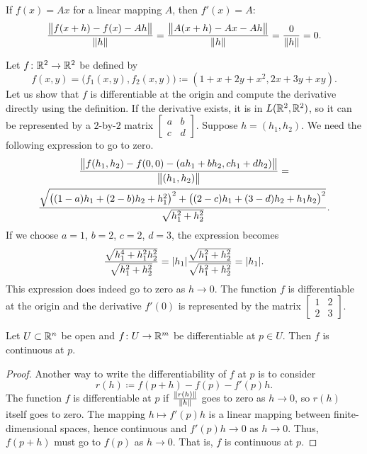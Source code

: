 \begin{example}
If $f(x) = Ax$ for a linear mapping $A$, then
$f'(x) = A$:
\begin{equation*}
\frac{\bigl\lVert {f(x+h)-f(x) - Ah} \bigr\rVert}{\lVert {h} \rVert}
=
\frac{\bigl\lVert {A(x+h)-Ax - Ah} \bigr\rVert}{\lVert {h} \rVert}
=
\frac{0}{\lVert {h} \rVert} = 0 .
\end{equation*}
\end{example}

\begin{example}
Let $f \colon {\mathbb{R}}^2 \to {\mathbb{R}}^2$ be defined by
\begin{equation*}
f(x,y) = \bigl(f_1(x,y),f_2(x,y)\bigr) \coloneqq (1+x+2y+x^2,2x+3y+xy).
\end{equation*}
Let us show that $f$ is differentiable at the origin and
compute the derivative directly using the definition.
If the derivative exists, it is in $L({\mathbb{R}}^2,{\mathbb{R}}^2)$, so it can be
represented by a $2$-by-$2$ matrix
$\left[\begin{smallmatrix}a&b\\c&d\end{smallmatrix}\right]$.  Suppose $h =
(h_1,h_2)$.  We need the following expression to go to zero.
\begin{multline*}
\frac{\bigl\lVert {
f(h_1,h_2)-f(0,0)
-
(ah_1 +bh_2 , ch_1+dh_2)} \bigr\rVert
}{\bigl\lVert {(h_1,h_2)} \bigr\rVert}
=
\\
\frac{\sqrt{
{\bigl((1-a)h_1 + (2-b)h_2 + h_1^2\bigr)}^2
+
{\bigl((2-c)h_1 + (3-d)h_2 + h_1h_2\bigr)}^2}}{\sqrt{h_1^2+h_2^2}} .
\end{multline*}
If we choose $a=1$, $b=2$, $c=2$, $d=3$, the expression becomes
\begin{equation*}
\frac{\sqrt{
h_1^4 + h_1^2h_2^2}}{\sqrt{h_1^2+h_2^2}}
=
\lvert {h_1} \rvert
\frac{\sqrt{
h_1^2 + h_2^2}}{\sqrt{h_1^2+h_2^2}}
= \lvert {h_1} \rvert .
\end{equation*}
This expression does indeed go to zero as $h \to 0$.  The
function $f$ is differentiable at the origin and 
the derivative $f'(0)$ is represented by the matrix
$\left[\begin{smallmatrix}1&2\\2&3\end{smallmatrix}\right]$.
\end{example}

\begin{prop}
Let $U \subset {\mathbb{R}}^n$ be open and $f \colon U \to {\mathbb{R}}^m$ be
differentiable at $p \in U$.  Then $f$ is continuous at $p$.
\end{prop}

\begin{proof}
Another way to write the differentiability of $f$ at $p$ is to consider
\begin{equation*}
r(h) \coloneqq f(p+h)-f(p) - f'(p) h .
\end{equation*}
The function $f$ is differentiable at $p$ if
$\frac{\lVert {r(h)} \rVert}{\lVert {h} \rVert}$ goes to zero as $h \to 0$,
so
$r(h)$ itself goes to zero.  The mapping $h \mapsto f'(p) h$
is a linear mapping between finite-dimensional spaces, hence continuous
and $f'(p) h \to 0$ as $h \to 0$.  Thus,
$f(p+h)$ must go to $f(p)$ as $h \to 0$.  That is, $f$ is continuous at $p$.
\end{proof}

